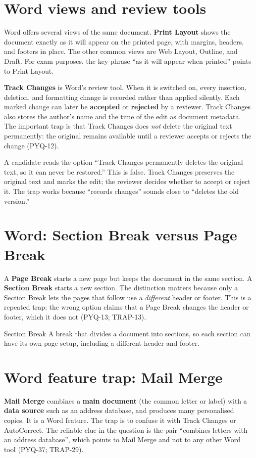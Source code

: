 \section{Word views and review tools}
Word offers several views of the same document. \textbf{Print Layout} shows
the document exactly as it will appear on the printed page, with margins,
headers, and footers in place. The other common views are Web Layout, Outline,
and Draft. For exam purposes, the key phrase ``as it will appear when printed''
points to Print Layout.

\textbf{Track Changes} is Word's review tool. When it is switched on, every
insertion, deletion, and formatting change is recorded rather than applied
silently. Each marked change can later be \textbf{accepted} or
\textbf{rejected} by a reviewer. Track Changes also stores the author's name
and the time of the edit as document metadata. The important trap is that
Track Changes does \emph{not} delete the original text permanently: the
original remains available until a reviewer accepts or rejects the change
(PYQ-12).

\begin{example}
A candidate reads the option ``Track Changes permanently deletes the original
text, so it can never be restored.'' This is false. Track Changes preserves
the original text and marks the edit; the reviewer decides whether to accept
or reject it. The trap works because ``records changes'' sounds close to
``deletes the old version.''
\end{example}

\section{Word: Section Break versus Page Break}
A \textbf{Page Break} starts a new page but keeps the document in the same
section. A \textbf{Section Break} starts a new section. The distinction
matters because only a Section Break lets the pages that follow use a
\emph{different} header or footer. This is a repeated trap: the wrong option
claims that a Page Break changes the header or footer, which it does not
(PYQ-13; TRAP-13).

\begin{definitionbox}{Section Break}
A break that divides a document into sections, so each section can have its
own page setup, including a different header and footer.
\end{definitionbox}

\section{Word feature trap: Mail Merge}
\textbf{Mail Merge} combines a \textbf{main document} (the common letter or
label) with a \textbf{data source} such as an address database, and produces
many personalised copies. It is a Word feature. The trap is to confuse it
with Track Changes or AutoCorrect. The reliable clue in the question is the
pair ``combines letters with an address database'', which points to Mail
Merge and not to any other Word tool (PYQ-37; TRAP-29).

